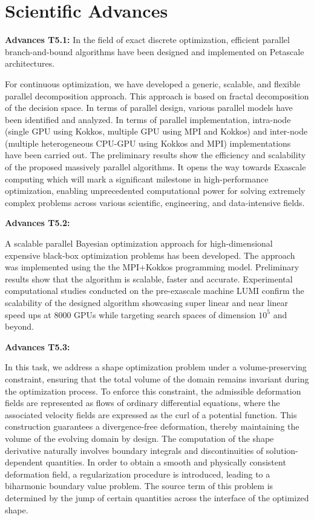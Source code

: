 \section{Scientific Advances}
  
{\bf Advances T5.1:}
In the field of exact discrete optimization, efficient parallel branch-and-bound algorithms have been designed and implemented on Petascale architectures. 

\medskip

For continuous optimization, we have developed a generic, scalable, and flexible parallel decomposition approach. This approach is based on fractal decomposition of the decision space. In terms of parallel design, various parallel models have been identified and analyzed. In terms of parallel implementation, intra-node (single GPU using Kokkos, multiple GPU using MPI and Kokkos) and inter-node (multiple heterogeneous CPU-GPU using Kokkos and MPI) implementations have been carried out. The preliminary results show the efficiency and scalability of the proposed massively parallel algorithms. It opens the way towards Exascale computing which will mark a significant milestone in high-performance optimization, enabling unprecedented computational power for solving extremely complex problems across various scientific, engineering, and data-intensive fields.

\medskip

{\bf Advances T5.2:} 

A scalable parallel Bayesian optimization approach for high-dimensional expensive black-box optimization problems has been developed. The approach was implemented using the the MPI+Kokkos programming model. Preliminary results show that the algorithm is scalable, faster and  accurate. Experimental computational studies conducted on the pre-exascale machine LUMI  confirm the scalability of the designed algorithm showcasing super linear and near linear speed ups at 8000 GPUs while targeting search spaces of dimension $10^5$ and beyond.

\medskip

{\bf Advances T5.3:}

In this task, we address a shape optimization problem under a volume-preserving constraint, ensuring that the total volume of the domain remains invariant during the optimization process. To enforce this constraint, the admissible deformation fields are represented as flows of ordinary differential equations, where the associated velocity fields are expressed as the curl of a potential function. This construction guarantees a divergence-free deformation, thereby maintaining the volume of the evolving domain by design. The computation of the shape derivative naturally involves boundary integrals and discontinuities of solution-dependent quantities. In order to obtain a smooth and physically consistent deformation field, a regularization procedure is introduced, leading to a biharmonic boundary value problem. The source term of this problem is determined by the jump of certain quantities across the interface of the optimized shape.

